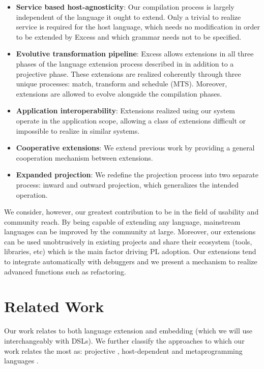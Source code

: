 \documentclass[conference]{IEEEtran}
\begin{document}
\begin{itemize}
   \item \textbf{Service based host-agnosticity}: Our compilation process is largely independent of the language it ought to extend. Only a trivial to realize service is required for the host language, which needs no modification in order to be extended by Excess and which grammar needs not to be specified.
   \item \textbf{Evolutive transformation pipeline}: Excess allows extensions in all three phases of the language extension process described in \cite{Standish} in addition to a projective phase. These extensions are realized coherently through three unique processes: match, transform and schedule  (MTS). Moreover, extensions are allowed to evolve alongside the compilation phases.
   \item \textbf{Application interoperability}: Extensions realized using our system operate in the application scope, allowing a class of extensions difficult or impossible to realize in similar systems.
   \item \textbf{Cooperative extensions}: We extend previous work \cite{Sujeeth} by providing a general cooperation mechanism between extensions.
   \item \textbf{Expanded projection}: We redefine the projection process \cite{Voelter} into two separate process: inward and outward projection, which generalizes the intended operation.
 \end{itemize}

We consider, however, our greatest contribution to be in the field of usability and community reach. By being capable of extending any language, mainstream languages can be improved by the community at large. 
Moreover, our extensions can be used unobtrusively in existing projects and share their ecosystem (tools, libraries, etc) which is the main factor driving PL adoption. 
Our extensions tend to integrate automatically with debuggers and we present a mechanism to realize advanced functions such as refactoring.

\section{Related Work}
Our work relates to both language extension and embedding (which we will use interchangeably with DSLs). We further classify the approaches to which our work relates the most as: projective \cite{Voelter, Spoofax}, host-dependent \cite{Brown, Racket} and metaprogramming languages \cite{Stratego, Rascal}. 
\end{document}
